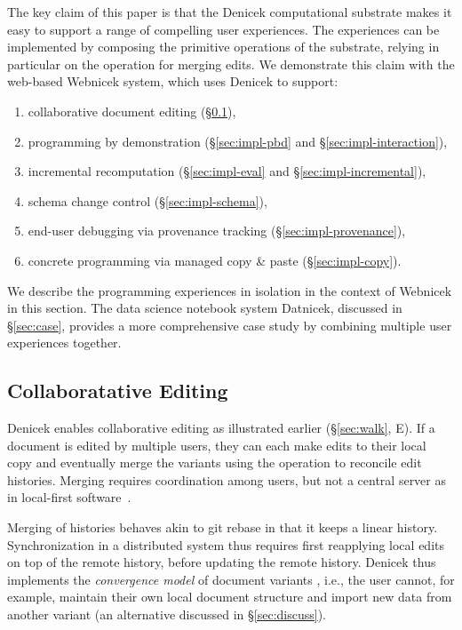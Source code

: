 \documentclass[sigconf,anonymous,screen]{acmart}
\begin{document}
The key claim of this paper is that the Denicek computational substrate makes it easy to support
a range of compelling user experiences. The experiences can be implemented by composing the
primitive operations of the substrate, relying in particular on the operation for merging edits.
We demonstrate this claim with the web-based Webnicek system, which uses Denicek to support:
%
\begin{enumerate}[itemsep=0pt,label=(\roman*),topsep=3pt,leftmargin=20pt]
\item collaborative document editing (\S\ref{sec:impl-collab}),
\item programming by demonstration (\S\ref{sec:impl-pbd} and \S\ref{sec:impl-interaction}),
\item incremental recomputation (\S\ref{sec:impl-eval} and \S\ref{sec:impl-incremental}),
\item schema change control (\S\ref{sec:impl-schema}),
\item end-user debugging via provenance tracking (\S\ref{sec:impl-provenance}),
\item concrete programming via managed copy \& paste (\S\ref{sec:impl-copy}).
\end{enumerate}
%
We describe the programming experiences in isolation in the context of Webnicek in this section.
The data science notebook system Datnicek, discussed in \S\ref{sec:case}, provides
a more comprehensive case study by combining multiple user experiences together.

\subsection{Collaboratative Editing}
\label{sec:impl-collab}

Denicek enables collaborative editing as illustrated earlier (\S\ref{sec:walk}, E).
If a document is edited by multiple users, they can each make edits to their local copy and
eventually merge the variants using the operation to reconcile edit histories. Merging requires
coordination among users, but not a central server as in local-first software~\cite{kleppmann-2019-local}.

Merging of histories behaves akin to git rebase in that it keeps a linear history. Synchronization
in a distributed system thus requires first reapplying local edits on top of the remote history,
before updating the remote history. Denicek thus implements the \emph{convergence model} of
document variants \cite{edwards-2025-schema}, i.e., the user cannot, for example, maintain their
own local document structure and import new data from another variant (an alternative discussed
in \S\ref{sec:discuss}).
\end{document}
